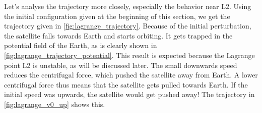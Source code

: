 Let's analyse the trajectory more closely, especially the behavior near L2. Using the initial configuration given at the beginning of this section, we get the trajectory given in \autoref{fig:lagrange_trajectory}. Because of the initial perturbation, the satellite falls towards Earth and starts orbiting. It gets trapped in the potential field of the Earth, as is clearly shown in \autoref{fig:lagrange_trajectory_potential}. This result is expected because the Lagrange point L2 is unstable, as will be discussed later. The small downwards speed reduces the centrifugal force, which pushed the satellite away from Earth. A lower centrifugal force thus means that the satellite gets pulled towards Earth. If the initial speed was upwards, the satellite would get pushed away! The trajectory in \autoref{fig:lagrange_v0_up} shows this.

